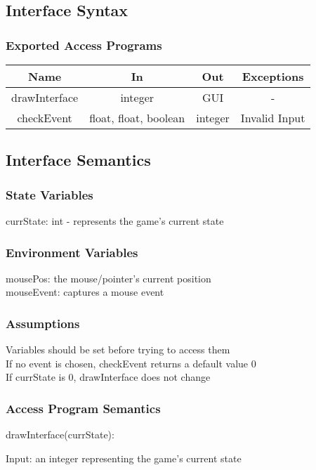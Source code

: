 \documentclass[12pt, titlepage]{article}
\begin{document}
		\subsection{Interface Syntax}
		\subsubsection{Exported Access Programs}
		\begin{tabular}[pos]{|c|c|c|c|}
			\hline
			\textbf{Name}& \textbf{In} & \textbf{Out} & \textbf{Exceptions} \\ \hline
			drawInterface & integer & GUI & - \\ \hline
			checkEvent & float, float, boolean & integer & Invalid Input \\ \hline
			
		\end{tabular}
		
		\subsection{Interface Semantics}
		\subsubsection{State Variables}
		currState: int - represents the game's current state
		
		\subsubsection{Environment Variables}
		mousePos: the mouse/pointer's current position\\
		mouseEvent: captures a mouse event 
		\subsubsection{Assumptions}
		Variables should be set before trying to access them \\ 
		If no event is chosen, checkEvent returns a default value 0 \\
		If currState is 0, drawInterface does not change \\
		
		\subsubsection{Access Program Semantics}
		drawInterface(currState):
		
		Input: an integer representing the game's current state
		
\end{document}

